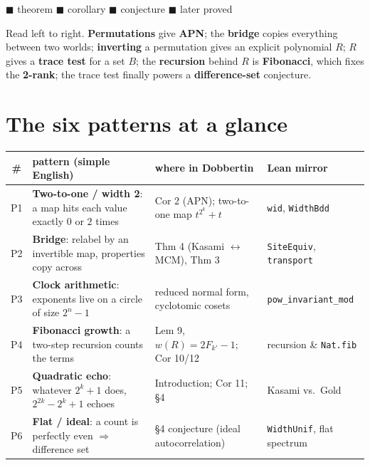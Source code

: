 \documentclass[11pt]{article}
\begin{document}
\begin{center}\footnotesize
\textcolor{blue!55!black}{$\blacksquare$ theorem}\quad
\textcolor{gray!60!black}{$\blacksquare$ corollary}\quad
\textcolor{orange!80!black}{$\blacksquare$ conjecture}\quad
\textcolor{green!45!black}{$\blacksquare$ later proved}
\end{center}

\begin{bigidea}
Read left to right. \textbf{Permutations} give \textbf{APN}; the \textbf{bridge}
copies everything between two worlds; \textbf{inverting} a permutation gives an
explicit polynomial $R$; $R$ gives a \textbf{trace test} for a set $B$; the
\textbf{recursion} behind $R$ is \textbf{Fibonacci}, which fixes the \textbf{2-rank};
the trace test finally powers a \textbf{difference-set} conjecture.
\end{bigidea}

\newpage
\section*{The six patterns at a glance}

\begin{center}\small
\renewcommand{\arraystretch}{1.45}
\begin{tabular}{@{}c p{4.1cm} p{4.4cm} p{3.0cm}@{}}
\hline
\textbf{\#} & \textbf{pattern (simple English)} & \textbf{where in Dobbertin} & \textbf{Lean mirror}\\
\hline
P1 & \textbf{Two-to-one / width 2}: a map hits each value exactly $0$ or $2$ times & Cor 2 (APN); two-to-one map $t^{2^k}+t$ & \texttt{wid}, \texttt{WidthBdd}\\
P2 & \textbf{Bridge}: relabel by an invertible map, properties copy across & Thm 4 (Kasami $\leftrightarrow$ MCM), Thm 3 & \texttt{SiteEquiv}, \texttt{transport}\\
P3 & \textbf{Clock arithmetic}: exponents live on a circle of size $2^n{-}1$ & reduced normal form, cyclotomic cosets & \texttt{pow\_invariant\_mod}\\
P4 & \textbf{Fibonacci growth}: a two-step recursion counts the terms & Lem 9, $w(R)=2F_{k'}{-}1$; Cor 10/12 & recursion \& \texttt{Nat.fib}\\
P5 & \textbf{Quadratic echo}: whatever $2^k{+}1$ does, $2^{2k}{-}2^k{+}1$ echoes & Introduction; Cor 11; {\S}4 & Kasami vs.\ Gold\\
P6 & \textbf{Flat / ideal}: a count is perfectly even $\Rightarrow$ difference set & {\S}4 conjecture (ideal autocorrelation) & \texttt{WidthUnif}, flat spectrum\\
\hline
\end{tabular}
\end{center}
\end{document}
